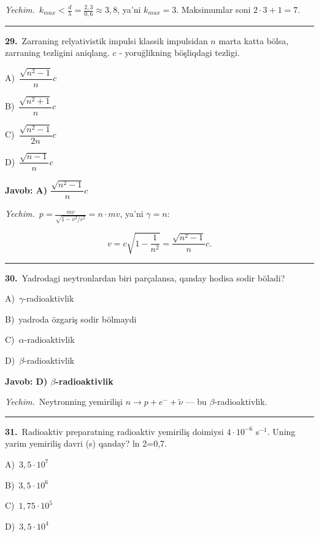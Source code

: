 \documentclass[11pt,a4paper]{article}
\newcommand{\opt}[2]{\hspace*{4mm}#1)\ #2\par}
\begin{document}
\noindent\textit{Yechim.}\ $k_{max}<\frac{d}{\lambda}=\frac{2{,}3}{0{,}6}\approx3{,}8$, ya’ni $k_{max}=3$. Maksimumlar soni $2\cdot3+1=7$.\par\par\medskip\hrule\medskip
{}\noindent\begin{minipage}{\linewidth}
\textbf{29.}\ Zarraning relyativistik impulsi klassik impulsidan $n$ marta katta bölsa, zarraning tezligini aniqlang. $c$ - yoruğlikning böşliqdagi tezligi.\par\smallskip
\opt{A}{$\dfrac{\sqrt{n^2-1}}{n}c$}
\opt{B}{$\dfrac{\sqrt{n^2+1}}{n}c$}
\opt{C}{$\dfrac{\sqrt{n^2-1}}{2n}c$}
\opt{D}{$\dfrac{\sqrt{n-1}}{n}c$}
\end{minipage}\vspace{2pt}\par
\noindent\colorbox{gray!12}{\parbox{\dimexpr\linewidth-2\fboxsep}{\textbf{Javob: A) $\dfrac{\sqrt{n^2-1}}{n}c$}}}\par\smallskip
\noindent\textit{Yechim.}\ $p=\frac{mv}{\sqrt{1-v^2/c^2}}=n\cdot mv$, ya’ni $\gamma=n$:\par
\[v=c\sqrt{1-\frac{1}{n^2}}=\frac{\sqrt{n^2-1}}{n}c.\]\par\medskip\hrule\medskip
{}\noindent\begin{minipage}{\linewidth}
\textbf{30.}\ Yadrodagi neytronlardan biri parçalansa, qanday hodisa sodir böladi?\par\smallskip
\opt{A}{$\gamma$-radioaktivlik}
\opt{B}{yadroda özgariş sodir bölmaydi}
\opt{C}{$\alpha$-radioaktivlik}
\opt{D}{$\beta$-radioaktivlik}
\end{minipage}\vspace{2pt}\par
\noindent\colorbox{gray!12}{\parbox{\dimexpr\linewidth-2\fboxsep}{\textbf{Javob: D) $\beta$-radioaktivlik}}}\par\smallskip
\noindent\textit{Yechim.}\ Neytronning yemirilişi $n\to p+e^-+\tilde\nu$ — bu $\beta$-radioaktivlik.\par\par\medskip\hrule\medskip
{}\noindent\begin{minipage}{\linewidth}
\textbf{31.}\ Radioaktiv preparatning radioaktiv yemiriliş doimiysi $4\cdot10^{-6}$ s$^{-1}$. Uning yarim yemiriliş davri (s) qanday? ln 2=0,7.\par\smallskip
\opt{A}{$3{,}5\cdot10^7$}
\opt{B}{$3{,}5\cdot10^6$}
\opt{C}{$1{,}75\cdot10^5$}
\opt{D}{$3{,}5\cdot10^4$}
\end{minipage}\vspace{2pt}\par
\end{document}
